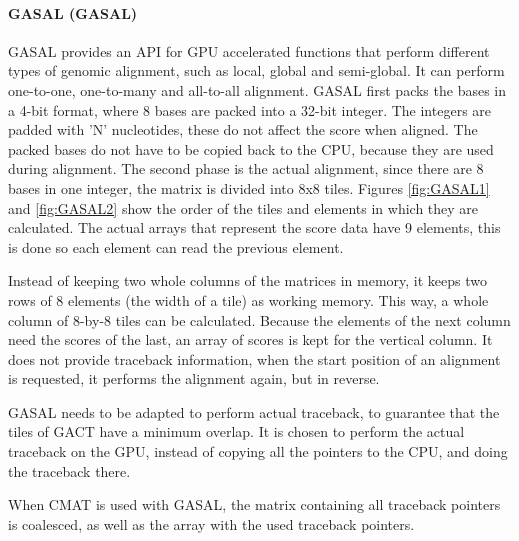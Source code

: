 \documentclass[../thesis.tex]{subfiles}
\begin{document}
\paragraph{GASAL (GASAL)}
GASAL \cite{GASAL} provides an API for GPU accelerated functions that perform different types of genomic alignment, such as local, global and semi-global.
It can perform one-to-one, one-to-many and all-to-all alignment.
GASAL first packs the bases in a 4-bit format, where 8 bases are packed into a 32-bit integer.
The integers are padded with 'N' nucleotides, these do not affect the score when aligned.
The packed bases do not have to be copied back to the CPU, because they are used during alignment.
The second phase is the actual alignment, since there are 8 bases in one integer, the matrix is divided into 8x8 tiles.
Figures \ref{fig:GASAL1} and \ref{fig:GASAL2} show the order of the tiles and elements in which they are calculated.
The actual arrays that represent the score data have 9 elements, this is done so each element can read the previous element.


Instead of keeping two whole columns of the matrices in memory, it keeps two rows of 8 elements (the width of a tile) as working memory.
This way, a whole column of 8-by-8 tiles can be calculated.
Because the elements of the next column need the scores of the last, an array of scores is kept for the vertical column.
It does not provide traceback information, when the start position of an alignment is requested, it performs the alignment again, but in reverse.

GASAL needs to be adapted to perform actual traceback, to guarantee that the tiles of GACT have a minimum overlap.
It is chosen to perform the actual traceback on the GPU, instead of copying all the pointers to the CPU, and doing the traceback there.


When CMAT is used with GASAL, the matrix containing all traceback pointers is coalesced, as well as the array with the used traceback pointers.

\end{document}
